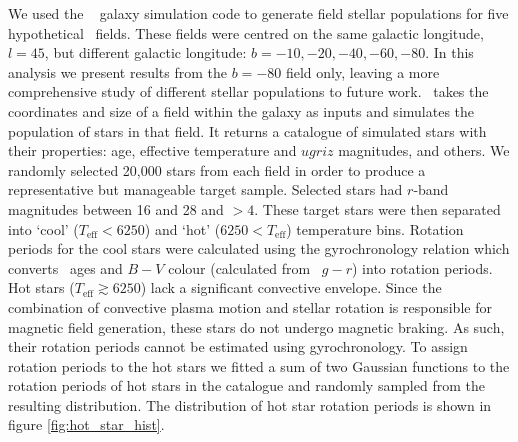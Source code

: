 We used the \TRILEGAL\ \citep{Girardi2012} galaxy simulation code to generate
field stellar populations for five hypothetical \LSST\ fields.
These fields were centred on the same galactic longitude, $l=45$, but
different galactic longitude: $b=-10,-20,-40,-60,-80$.
In this analysis we present results from the $b=-80$ field only, leaving a
more comprehensive study of different stellar populations to future work.
\TRILEGAL\ takes the coordinates and size of a field within the galaxy as
inputs and simulates the population of stars in that field.
It returns a catalogue of simulated stars with their properties: age,
effective temperature and $ugriz$ magnitudes, and others.
We randomly selected 20,000 stars from each field in order to produce a
representative but manageable target sample.
Selected stars had $r$-band magnitudes between 16 and 28 and \logg $>4$.
These target stars were then separated into `cool' ($T_{\mathrm{eff}}< 6250$)
and `hot' ($6250 < T_{\mathrm{eff}}$) temperature bins.
Rotation periods for the cool stars were calculated using the
\citet{Angus2015} gyrochronology relation which converts \TRILEGAL\ ages and
$B-V$ colour (calculated from \TRILEGAL\ $g-r$) into rotation periods.
Hot stars ($T_{\mathrm{eff}}\gtrsim 6250$) lack a significant convective
envelope.
Since the combination of convective plasma motion and stellar rotation is
responsible for magnetic field generation, these stars do not undergo magnetic
braking.
As such, their rotation periods cannot be estimated using gyrochronology.
To assign rotation periods to the hot stars we fitted a sum of two Gaussian
functions to the rotation periods of hot stars in the \citet{Mcquillan2014}
catalogue and randomly sampled from the resulting distribution.
The distribution of hot star rotation periods is shown in figure
\ref{fig:hot_star_hist}.

